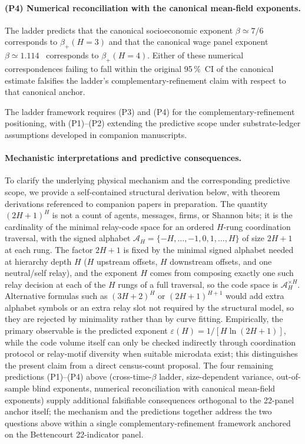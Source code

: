 \paragraph{(P4) Numerical reconciliation with the canonical mean-field exponents.}
The ladder predicts that the canonical socioeconomic exponent
$\beta\simeq 7/6$~\cite{Bettencourt2013} corresponds to
$\beta_+(H{=}3)$ and that the canonical wage panel exponent
$\beta\simeq 1.114$~\cite{Bettencourt2020SciAdv} corresponds to
$\beta_+(H{=}4)$. Either of these numerical correspondences failing to
fall within the original 95\,\%~CI of the canonical estimate
falsifies the ladder's complementary-refinement claim with respect to
that canonical anchor.

The ladder framework requires (P3) and (P4) for the
complementary-refinement positioning, with (P1)--(P2) extending the
predictive scope under substrate-ledger assumptions developed in
companion manuscripts.

\paragraph{Mechanistic interpretations and predictive consequences.}
To clarify the underlying physical mechanism and the corresponding predictive scope, we provide a self-contained structural derivation below, with theorem derivations referenced to companion papers in preparation. The quantity $(2H+1)^H$ is not a count of agents, messages, firms, or Shannon bits; it is the cardinality of the minimal relay-code space for an ordered $H$-rung coordination traversal, with the signed alphabet $\mathcal{A}_H=\{-H,\dots,-1,0,1,\dots,H\}$ of size $2H+1$ at each rung. The factor $2H+1$ is fixed by the minimal signed alphabet needed at hierarchy depth $H$ ($H$ upstream offsets, $H$ downstream offsets, and one neutral/self relay), and the exponent $H$ comes from composing exactly one such relay decision at each of the $H$ rungs of a full traversal, so the code space is $\mathcal{A}_H^{\times H}$. Alternative formulas such as $(3H+2)^H$ or $(2H+1)^{H+1}$ would add extra alphabet symbols or an extra relay slot not required by the structural model, so they are rejected by minimality rather than by curve fitting. Empirically, the primary observable is the predicted exponent $\varepsilon(H)=1/[H\ln(2H+1)]$, while the code volume itself can only be checked indirectly through coordination protocol or relay-motif diversity when suitable microdata exist; this distinguishes the present claim from a direct census-count proposal. The four remaining predictions (P1)--(P4) above (cross-time-$\beta$ ladder, size-dependent variance, out-of-sample blind exponents, numerical reconciliation with canonical mean-field exponents) supply additional falsifiable consequences orthogonal to the 22-panel anchor itself; the mechanism and the predictions together address the two questions above within a single complementary-refinement framework anchored on the Bettencourt 22-indicator panel.


